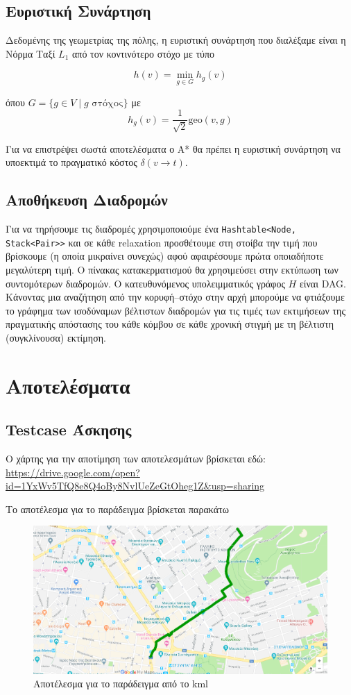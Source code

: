 \documentclass[a4paper,12pt]{article}
\begin{document}
\subsection{Ευριστική Συνάρτηση}

Δεδομένης της γεωμετρίας της πόλης, η ευριστική συνάρτηση που διαλέξαμε είναι η Νόρμα Ταξί $L_1$ από τον κοντινότερο στόχο με τύπο 

$$h(v) = \min_{g \in G} h_g(v)$$

όπου $G = \{ g \in V \mid g \text{ στόχος} \}$ με $$h_g(v) = \frac 1 {\sqrt 2} \mathrm{geo}(v, g)$$
 
Για να επιστρέψει σωστά αποτελέσματα ο Α* θα πρέπει η ευριστική συνάρτηση να υποεκτιμά το πραγματικό κόστος $\delta (v \to t)$. 
\subsection{Αποθήκευση Διαδρομών} 

Για να τηρήσουμε τις διαδρομές χρησιμοποιούμε ένα \texttt{Hashtable<Node, Stack<Pair>>} και σε κάθε relaxation προσθέτουμε στη στοίβα την τιμή που βρίσκουμε (η οποία μικραίνει συνεχώς) αφού αφαιρέσουμε πρώτα οποιαδήποτε μεγαλύτερη τιμή. Ο πίνακας κατακερματισμού θα χρησιμεύσει στην εκτύπωση των συντομότερων διαδρομών. Ο κατευθυνόμενος υπολειμματικός γράφος $H$ είναι DAG. Κάνοντας μια αναζήτηση από την κορυφή--στόχο στην αρχή μπορούμε να φτιάξουμε το γράφημα των ισοδύναμων βέλτιστων διαδρομών για τις τιμές των εκτιμήσεων της πραγματικής απόστασης του κάθε κόμβου σε κάθε χρονική στιγμή με τη βέλτιστη (συγκλίνουσα) εκτίμηση. 

\section{Αποτελέσματα}

\subsection{Testcase Άσκησης} 

Ο χάρτης για την αποτίμηση των αποτελεσμάτων βρίσκεται εδώ:
\url{https://drive.google.com/open?id=1YxWv5TfQ8e8Q4oBy8NvlUeZeGtOheg1Z&usp=sharing}

Το αποτέλεσμα για το παράδειγμα βρίσκεται παρακάτω
\begin{figure}[H]
    \centering
    \includegraphics[scale=0.3]{example.png}
    \caption{Αποτέλεσμα για το παράδειγμα από το kml}
    \label{fig:my_label}
\end{figure}
\end{document}
